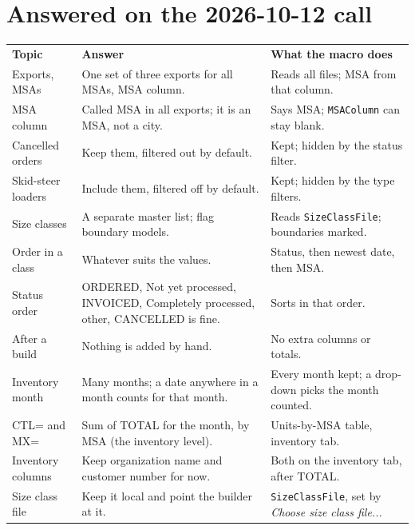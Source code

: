 \documentclass[11pt]{article}
\newcommand{\menu}[1]{\textit{#1}}
\begin{document}
\section{Answered on the 2026-10-12 call}
\begin{center}
\small
{}
\renewcommand{\arraystretch}{1.1}
\begin{tabularx}{\linewidth}{|>{\raggedright\arraybackslash}m{1.2in}|L|L|}
  \hline
  \bfseries Topic & \bfseries Answer & \bfseries What the macro does \\
  \hhline{|=|=|=|}
  Exports, MSAs & One set of three exports for all MSAs, MSA column. & Reads all files; MSA from that column. \\
  \hline
  MSA column & Called MSA in all exports; it is an MSA, not a city. & Says MSA; \texttt{MSAColumn} can stay blank. \\
  \hline
  Cancelled orders & Keep them, filtered out by default. & Kept; hidden by the status filter. \\
  \hline
  Skid-steer loaders & Include them, filtered off by default. & Kept; hidden by the type filters. \\
  \hline
  Size classes & A separate master list; flag boundary models. & Reads \texttt{SizeClassFile}; boundaries marked. \\
  \hline
  Order in a class & Whatever suits the values. & Status, then newest date, then MSA. \\
  \hline
  Status order & ORDERED, Not yet processed, INVOICED, Completely processed, other, CANCELLED is fine. & Sorts in that order. \\
  \hline
  After a build & Nothing is added by hand. & No extra columns or totals. \\
  \hline
  Inventory month & Many months; a date anywhere in a month counts for that month. & Every month kept; a drop-down picks the month counted. \\
  \hline
  CTL= and MX= & Sum of TOTAL for the month, by MSA (the inventory level). & Units-by-MSA table, inventory tab. \\
  \hline
  Inventory columns & Keep organization name and customer number for now. & Both on the inventory tab, after TOTAL. \\
  \hline
  Size class file & Keep it local and point the builder at it. & \texttt{SizeClassFile}, set by \menu{Choose size class file...} \\
  \hline
\end{tabularx}
\end{center}
\end{document}
